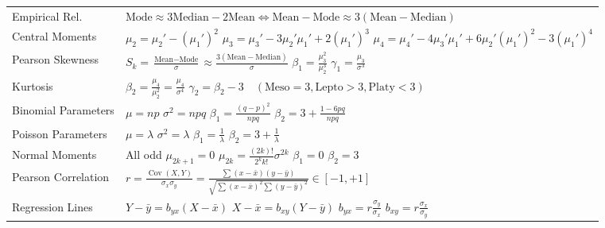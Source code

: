 \documentclass[12pt,a4paper]{article}
\renewcommand{\arraystretch}{1.45}
\begin{document}
\begin{tcolorbox}[formulabox, title={\textbf{Key Formulas and Statistical Identities at a Glance}}]
\renewcommand{\arraystretch}{1.35}
\setlength{\tabcolsep}{5pt}
\noindent\begin{tabularx}{\linewidth}{B{3.5cm} Y}
Empirical Rel. & $\text{Mode} \approx 3\text{Median} - 2\text{Mean} \iff \text{Mean}-\text{Mode} \approx 3(\text{Mean}-\text{Median})$ \\[3pt]
Central Moments & $\mu_2 = \mu_2'-(\mu_1')^2$ \newline $\mu_3 = \mu_3'-3\mu_2'\mu_1'+2(\mu_1')^3$ \newline $\mu_4 = \mu_4'-4\mu_3'\mu_1'+6\mu_2'(\mu_1')^2-3(\mu_1')^4$ \\[3pt]
Pearson Skewness & $S_k = \frac{\text{Mean}-\text{Mode}}{\sigma} \approx \frac{3(\text{Mean}-\text{Median})}{\sigma}$ \newline $\beta_1 = \frac{\mu_3^2}{\mu_2^3}$ \quad $\gamma_1 = \frac{\mu_3}{\sigma^3}$ \\[3pt]
Kurtosis & $\beta_2 = \frac{\mu_4}{\mu_2^2} = \frac{\mu_4}{\sigma^4}$ \newline $\gamma_2 = \beta_2 - 3 \quad (\text{Meso}=3, \text{Lepto}>3, \text{Platy}<3)$ \\[3pt]
Binomial Parameters & $\mu = np$ \quad $\sigma^2 = npq$ \newline $\beta_1 = \frac{(q-p)^2}{npq}$ \newline $\beta_2 = 3 + \frac{1-6pq}{npq}$ \\[3pt]
Poisson Parameters & $\mu = \lambda$ \quad $\sigma^2 = \lambda$ \newline $\beta_1 = \frac{1}{\lambda}$ \newline $\beta_2 = 3 + \frac{1}{\lambda}$ \\[3pt]
Normal Moments & All odd $\mu_{2k+1}=0$ \newline $\mu_{2k} = \frac{(2k)!}{2^k k!} \sigma^{2k}$ \newline $\beta_1 = 0$ \quad $\beta_2 = 3$ \\[3pt]
Pearson Correlation & $r = \frac{\operatorname{Cov}(X,Y)}{\sigma_x \sigma_y} = \frac{\sum(x-\bar{x})(y-\bar{y})}{\sqrt{\sum(x-\bar{x})^2\sum(y-\bar{y})^2}} \in [-1, +1]$ \\[3pt]
Regression Lines & $Y-\bar{y} = b_{yx}(X-\bar{x})$ \newline $X-\bar{x} = b_{xy}(Y-\bar{y})$ \newline $b_{yx} = r\frac{\sigma_y}{\sigma_x}$ \newline $b_{xy} = r\frac{\sigma_x}{\sigma_y}$ \\[3pt]

\end{tabularx}
\end{tcolorbox}
\end{document}
